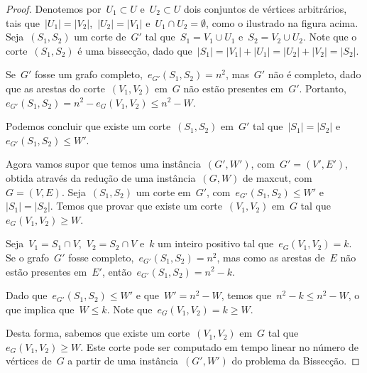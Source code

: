 \begin{proof}
		Denotemos por~${U_1\subset U}$ e~${U_2\subset U}$ dois conjuntos de vértices
		arbitrários, 
		tais que~${|U_1| = |V_2|}$,~${|U_2| = |V_1|}$ e~$U_1\cap U_2 = \emptyset$,
		como o ilustrado na figura acima.
		Seja~$(S_1,S_2)$ um corte de~$G'$ tal que~${S_1=V_1\cup U_1}$
		e~${S_2=V_2\cup U_2}$. 
		Note que o corte~$(S_1,S_2)$ é uma bissecção, dado 
		que~${|S_1| = |V_1| + |U_1| = |U_2|+|V_2| = |S_2|}$.

		Se~$G'$ fosse um grafo completo,~$e_{G'}(S_1,S_2) = n^2$,
		mas~$G'$ não é completo, dado que as arestas do corte~$(V_1,V_2)$
		em~$G$ não estão presentes em~$G'$.
		Portanto,~${e_{G'}(S_1,S_2) = n^2 - e_G(V_1,V_2)\le n^2-W}$.

		Podemos concluir que existe um corte~$(S_1,S_2)$ em~$G'$ tal que~${|S_1|=|S_2|}$ 
		e~${e_{G'}(S_1,S_2)\le W'}$.

		\bigskip

		Agora vamos supor que temos uma instância~$(G',W')$, com~${G'=(V',E')}$,
		obtida através da redução de uma instância~$(G,W)$ de {\sc maxcut}, 
		com~${G=(V,E)}$.
		Seja~$(S_1,S_2)$ um corte em~$G'$, com~${e_{G'}(S_1,S_2)\le W'}$ 
		e~${|S_1| = |S_2|}$.
		Temos que provar que existe um corte~$(V_1,V_2)$ em~$G$ tal 
		que~$e_G(V_1,V_2)\ge W$.

		Seja~${V_1 = S_1\cap V}$,~${V_2 = S_2\cap V}$
		e~$k$ um inteiro positivo tal que~${e_G(V_1,V_2) = k}$. 
		Se o grafo~$G'$ fosse completo,~${e_{G'}(S_1,S_2) = n^2}$,
		mas como as arestas de~$E$ não estão presentes em~$E'$,
		então~${e_{G'}(S_1, S_2) = n^2 - k}$.

		Dado que~$e_{G'}(S_1,S_2)\le W'$ e que~$W'= n^2-W$, 
		temos que~$n^2-k \le n^2 -W$,
		o que implica que~$W\le k$.
		Note que~$e_G(V_1,V_2) = k \ge W$.

		Desta forma, sabemos que existe um corte~$(V_1,V_2)$
		em~$G$ tal que~$e_G(V_1,V_2)\ge W$.
		Este corte pode ser computado em tempo linear no número
		de vértices de~$G$ a partir de uma instância~$(G',W')$
		do problema da Bissecção.
	\end{proof}

\bigskip
\bigskip
